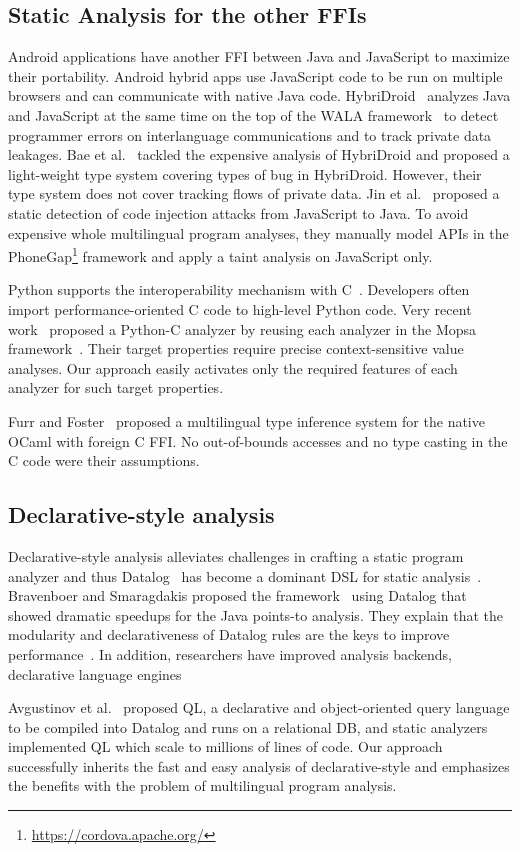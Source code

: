\subsection{Static Analysis for the other FFIs}
Android applications have another FFI between Java and JavaScript to maximize
their portability.  Android hybrid apps use JavaScript code to be run on
multiple browsers and can communicate with native Java code.
HybriDroid~\cite{hybridroid} analyzes Java and JavaScript at the same time on
the top of the WALA framework~\cite{WALA} to detect programmer errors on interlanguage
communications and to track private data leakages.  Bae et al.~\cite{BaeICSE19}
tackled the expensive analysis of HybriDroid and proposed a light-weight type
system covering types of bug in HybriDroid.  However, their type system does not
cover tracking flows of private data.  Jin et al.~\cite{jin2014code} proposed a
static detection of code injection attacks from JavaScript to Java.  To avoid
expensive whole multilingual program analyses, they manually model APIs in the
PhoneGap\footnote{\url{https://cordova.apache.org/}} framework and apply a taint
analysis on JavaScript only.

Python supports the interoperability mechanism with C~\cite{PythonC}.
Developers often import performance-oriented C code to high-level Python code.
Very recent work~\cite{sas2021} proposed a Python-C analyzer by reusing each
analyzer in the Mopsa framework~\cite{Mopsa}.  Their target properties require
precise context-sensitive value analyses.  Our approach easily activates only
the required features of each analyzer for such target properties.

Furr and Foster~\cite{furr2005, furr2008} proposed a multilingual type inference
system for the native OCaml with foreign C FFI.  No out-of-bounds accesses and
no type casting in the C code were their assumptions.

\subsection{Declarative-style analysis}
Declarative-style analysis alleviates challenges in crafting a static program
analyzer and thus Datalog~\cite{allen2015D, allen2015stagedD, alpuente2010D, doop, dawson1996D, naik2006D, reps1994D, smaragdakis2014D, whaley2005D} has become a dominant
DSL for static analysis~\cite{scholz2016}.
Bravenboer and Smaragdakis proposed the \doop framework~\cite{doop} using Datalog
that showed dramatic speedups for the Java points-to analysis.  They explain that
the modularity and declarativeness of Datalog rules are the keys to improve
performance~\cite{doopWorkshop}.  In addition, researchers have improved
analysis backends, declarative language engines%

Avgustinov et al.~\cite{ql2016} proposed QL, a declarative and object-oriented
query language to be compiled into Datalog and runs on a relational DB, and static
analyzers implemented QL which scale to millions of lines of code.
Our approach successfully inherits the fast and easy analysis of declarative-style
and emphasizes the benefits with the problem of multilingual program analysis.
